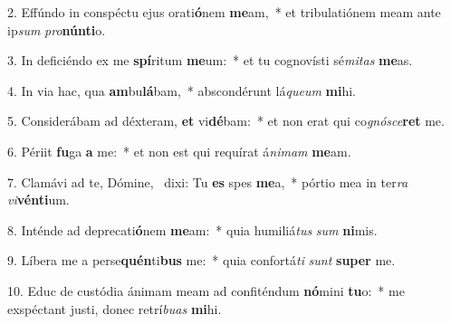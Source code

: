 2. Effúndo in conspéctu ejus orati\textbf{ó}nem \textbf{me}am,~*  et tribulatiónem meam ante ip\textit{sum} \textit{pro}\textbf{nún}\textbf{ti}o.\

3. In deficiéndo ex me \textbf{spí}ritum \textbf{me}um:~*  et tu cognovísti sé\textit{mi}\textit{tas} \textbf{me}as.\

4. In via hac, qua \textbf{am}bu\textbf{lá}bam,~*  abscondérunt lá\textit{que}\textit{um} \textbf{mi}hi.\

5. Considerábam ad déxteram, \textbf{et} vi\textbf{dé}bam:~*  et non erat qui co\textit{gnó}\textit{sce}\textbf{ret} me.\

6. Périit \textbf{fu}ga \textbf{a} me:~*  et non est qui requírat á\textit{ni}\textit{mam} \textbf{me}am.\

7. Clamávi ad te, Dómine, \dag\  dixi: Tu \textbf{es} spes \textbf{me}a,~*  pórtio mea in ter\textit{ra} \textit{vi}\textbf{vén}\textbf{ti}um.\

8. Inténde ad deprecati\textbf{ó}nem \textbf{me}am:~*  quia humiliá\textit{tus} \textit{sum} \textbf{ni}mis.\

9. Líbera me a perse\textbf{quén}ti\textbf{bus} me:~*  quia confortá\textit{ti} \textit{sunt} \textbf{su}\textbf{per} me.\

10. Educ de custódia ánimam meam ad confiténdum \textbf{nó}mini \textbf{tu}o:~*  me exspéctant justi, donec retrí\textit{bu}\textit{as} \textbf{mi}hi.\

